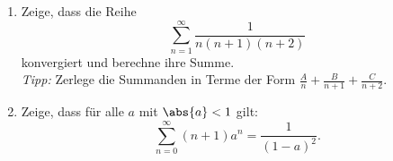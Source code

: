 \begin{prob}
  \begin{enumerate}[label=(\alph*)]
  \item Zeige, dass die Reihe
    \begin{equation*}
      \sum_{n=1}^{\infty} \frac{1}{n(n+1)(n+2)}
    \end{equation*}
    konvergiert und berechne ihre Summe. \\
    \textit{Tipp:} Zerlege die Summanden in Terme der Form
    $\frac{A}{n} + \frac{B}{n + 1} + \frac{C}{n + 2}$.
  \item Zeige, dass für alle $a$ mit $\abs{a} < 1$ gilt:
    \begin{equation*}
      \sum_{n=0}^{\infty}(n + 1) a^n
      =
      \frac{1}{(1 - a)^2}.
    \end{equation*}
  \end{enumerate}
\end{prob}
